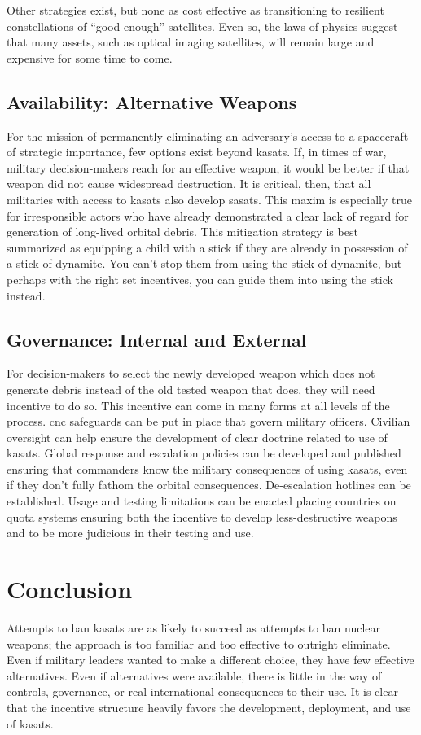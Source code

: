 Other strategies exist, but none as cost effective as transitioning to
resilient constellations of ``good enough'' satellites.  Even so, the
laws of physics suggest that many assets, such as optical imaging
satellites, will remain large and expensive for some time to come.


\subsection*{Availability: Alternative Weapons}
For the mission of permanently eliminating an adversary's access to a
spacecraft of strategic importance, few options exist beyond
\acp{kasat}.  If, in times of war, military decision-makers reach for
an effective weapon, it would be better if that weapon did not cause
widespread destruction.  It is critical, then, that all militaries
with access to \acp{kasat} also develop \acp{sasat}.  This maxim is
especially true for irresponsible actors who have already demonstrated
a clear lack of regard for generation of long-lived orbital debris.
This mitigation strategy is best summarized as equipping a child with
a stick if they are already in possession of a stick of dynamite.  You
can't stop them from using the stick of dynamite, but perhaps with the
right set incentives, you can guide them into using the stick instead.

\subsection*{Governance: Internal and External}
For decision-makers to select the newly developed weapon which does
not generate debris instead of the old tested weapon that does, they
will need incentive to do so.  This incentive can come in many forms
at all levels of the process. \ac{cnc} safeguards can be put in place
that govern military officers.  Civilian oversight can help ensure the
development of clear doctrine related to use of \acp{kasat}.  Global
response and escalation policies can be developed and published
ensuring that commanders know the military consequences of using
\acp{kasat}, even if they don't fully fathom the orbital consequences.
De-escalation hotlines can be established.  Usage and testing
limitations can be enacted placing countries on quota systems ensuring
both the incentive to develop less-destructive weapons and to be more
judicious in their testing and use.

\section*{Conclusion}
Attempts to ban \acp{kasat} are as likely to succeed as attempts to
ban nuclear weapons; the approach is too familiar and too effective to
outright eliminate.  Even if military leaders wanted to make a
different choice, they have few effective alternatives.  Even if
alternatives were available, there is little in the way of controls,
governance, or real international consequences to their use.  It is
clear that the incentive structure heavily favors the development,
deployment, and use of \acp{kasat}.

